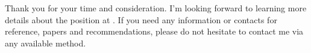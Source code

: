  
 
 
 
Thank you for your time and consideration. I'm looking forward to learning more details about the \position\;position at \company. If you need any information or contacts for reference, papers and recommendations, please do not hesitate to contact me via any available method.
